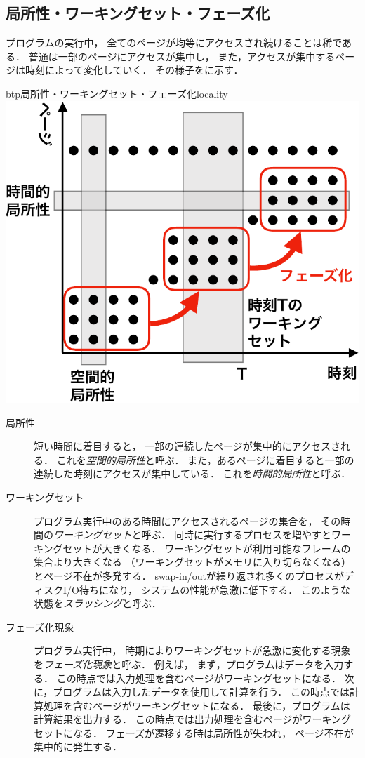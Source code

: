 \subsection{局所性・ワーキングセット・フェーズ化}
プログラムの実行中，
全てのページが均等にアクセスされ続けることは稀である．
普通は一部のページにアクセスが集中し，
また，アクセスが集中するページは時刻によって変化していく．
その様子をに示す．

\begin{myfig}{btp}{局所性・ワーキングセット・フェーズ化}{locality}
  \includegraphics[scale=0.60]{Fig/locality-crop.pdf}
\end{myfig}

\begin{description}
\item[局所性]
  短い時間に着目すると，
  一部の連続したページが集中的にアクセスされる．
  これを\emph{空間的局所性}と呼ぶ．
  また，あるページに着目すると一部の連続した時刻にアクセスが集中している．
  これを\emph{時間的局所性}と呼ぶ．
\item[ワーキングセット]
  プログラム実行中のある時間にアクセスされるページの集合を，
  その時間の\emph{ワーキングセット}と呼ぶ．
  同時に実行するプロセスを増やすとワーキングセットが大きくなる．
  ワーキングセットが利用可能なフレームの集合より大きくなる
  （ワーキングセットがメモリに入り切らなくなる）とページ不在が多発する．
  swap-in/outが繰り返され多くのプロセスがディスクI/O待ちになり，
  システムの性能が急激に低下する．
  このような状態を\emph{スラッシング}と呼ぶ．
\item[フェーズ化現象]
  プログラム実行中，
  時期によりワーキングセットが急激に変化する現象を\emph{フェーズ化現象}と呼ぶ．
  例えば，
  まず，プログラムはデータを入力する．
  この時点では入力処理を含むページがワーキングセットになる．
  次に，プログラムは入力したデータを使用して計算を行う．
  この時点では計算処理を含むページがワーキングセットになる．
  最後に，プログラムは計算結果を出力する．
  この時点では出力処理を含むページがワーキングセットになる．
  フェーズが遷移する時は局所性が失われ，
  ページ不在が集中的に発生する．
\end{description}

